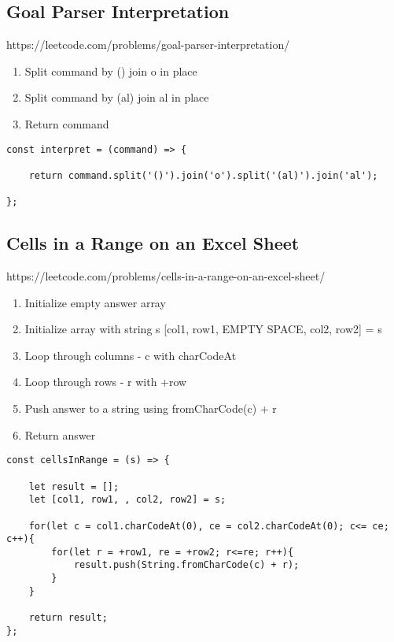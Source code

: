 \documentclass[10pt]{article}
\begin{document}
\pagebreak %
\medskip 
\subsection{Goal Parser Interpretation}
https://leetcode.com/problems/goal-parser-interpretation/

\begin{enumerate}
	\item Split command by () join o in place
	\item Split command by (al) join al in place
	\item Return command
\end{enumerate}

\begin{lstlisting}[title=Solution interpret, captionpos=t]
const interpret = (command) => {

    return command.split('()').join('o').split('(al)').join('al');
    
};
\end{lstlisting}
\medskip %




\pagebreak %
\medskip 
\subsection{Cells in a Range on an Excel Sheet}
https://leetcode.com/problems/cells-in-a-range-on-an-excel-sheet/

\begin{enumerate}
	\item Initialize empty answer array
	\item Initialize array with string s [col1, row1, EMPTY SPACE, col2, row2] = s
	\item Loop through columns - c with charCodeAt
	\item Loop through rows - r with +row
	\item Push answer to a string using fromCharCode(c) + r
	\item Return answer
\end{enumerate}

\begin{lstlisting}[title=Solution cellsInRange, captionpos=t]
const cellsInRange = (s) => {

    let result = [];
    let [col1, row1, , col2, row2] = s;
    
    for(let c = col1.charCodeAt(0), ce = col2.charCodeAt(0); c<= ce; c++){
        for(let r = +row1, re = +row2; r<=re; r++){
            result.push(String.fromCharCode(c) + r);
        }
    }
    
    return result;
};
\end{lstlisting}
\medskip %
\end{document}
